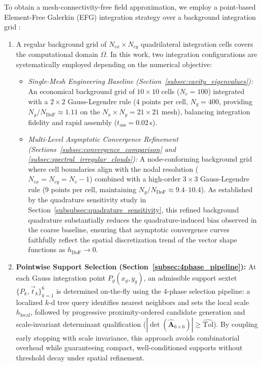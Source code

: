 \documentclass[preprint,12pt]{elsarticle}
\begin{document}
To obtain a mesh-connectivity-free field approximation, we employ a point-based Element-Free Galerkin (EFG) integration strategy over a background integration grid \cite{belytschko1994element, parreira2006efficient}:
\begin{enumerate}
    \item A regular background grid of $N_{cx} \times N_{cy}$ quadrilateral integration cells covers the computational domain $\Omega$. In this work, two integration configurations are systematically employed depending on the numerical objective:
          \begin{itemize}
              \item \emph{Single-Mesh Engineering Baseline (Section~\ref{subsec:cavity_eigenvalues}):} An economical background grid of $10 \times 10$ cells ($N_c = 100$) integrated with a $2 \times 2$ Gauss-Legendre rule ($4$ points per cell, $N_g = 400$, providing $N_g / N_{\mathrm{DoF}} \approx 1.11$ on the $N_x \times N_y = 21 \times 21$ mesh), balancing integration fidelity and rapid assembly ($t_{\mathrm{ass}} = 0.02$\,s).
              \item \emph{Multi-Level Asymptotic Convergence Refinement (Sections~\ref{subsec:convergence_comparison} and \ref{subsec:spectral_irregular_clouds}):} A node-conforming background grid where cell boundaries align with the nodal resolution ($N_{cx} = N_{cy} = N_v - 1$) combined with a high-order $3 \times 3$ Gauss-Legendre rule ($9$ points per cell, maintaining $N_g / N_{\mathrm{DoF}} \approx 9.4\text{--}10.4$). As established by the quadrature sensitivity study in Section~\ref{subsubsec:quadrature_sensitivity}, this refined background quadrature substantially reduces the quadrature-induced bias observed in the coarse baseline, ensuring that asymptotic convergence curves faithfully reflect the spatial discretization trend of the vector shape functions as $h_{\mathrm{DoF}} \to 0$.
          \end{itemize}
    \item \textbf{Pointwise Support Selection (Section~\ref{subsec:4phase_pipeline}):} At each Gauss integration point $P_g(x_g, y_g)$, an admissible support sextet $\{P_k, \vec{t}_k\}_{k=1}^6$ is determined on-the-fly using the 4-phase selection pipeline: a localized $k$-d tree query identifies nearest neighbors and sets the local scale $h_{\mathrm{local}}$, followed by progressive proximity-ordered candidate generation and scale-invariant determinant qualification ($|\det(\widehat{\mathbf{A}}_{6 \times 6})| \ge \widehat{\mathrm{Tol}}$). By coupling early stopping with scale invariance, this approach avoids combinatorial overhead while guaranteeing compact, well-conditioned supports without threshold decay under spatial refinement.

\end{enumerate}
\end{document}

